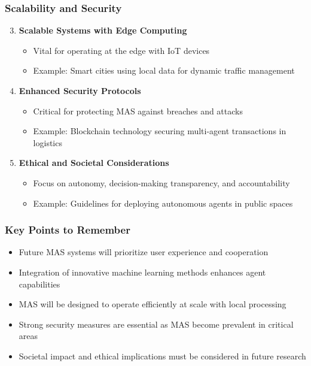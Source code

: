\documentclass[aspectratio=169]{beamer}
\begin{document}
\begin{frame}[fragile]
    \frametitle{Scalability and Security}
    \begin{enumerate}
        \setcounter{enumi}{2}
        \item \textbf{Scalable Systems with Edge Computing}
            \begin{itemize}
                \item Vital for operating at the edge with IoT devices
                \item Example: Smart cities using local data for dynamic traffic management
            \end{itemize}

        \item \textbf{Enhanced Security Protocols}
            \begin{itemize}
                \item Critical for protecting MAS against breaches and attacks
                \item Example: Blockchain technology securing multi-agent transactions in logistics
            \end{itemize}

        \item \textbf{Ethical and Societal Considerations}
            \begin{itemize}
                \item Focus on autonomy, decision-making transparency, and accountability
                \item Example: Guidelines for deploying autonomous agents in public spaces
            \end{itemize}
    \end{enumerate}
\end{frame}

\begin{frame}[fragile]
    \frametitle{Key Points to Remember}
    \begin{itemize}
        \item Future MAS systems will prioritize user experience and cooperation
        \item Integration of innovative machine learning methods enhances agent capabilities
        \item MAS will be designed to operate efficiently at scale with local processing
        \item Strong security measures are essential as MAS become prevalent in critical areas
        \item Societal impact and ethical implications must be considered in future research
    \end{itemize}
\end{frame}
\end{document}
